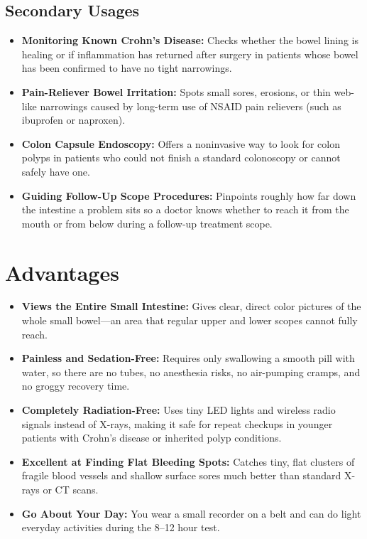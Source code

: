 \subsection{Secondary Usages}
\begin{itemize}
    \item \textbf{Monitoring Known Crohn's Disease:} Checks whether the bowel lining is healing or if inflammation has returned after surgery in patients whose bowel has been confirmed to have no tight narrowings.
    \item \textbf{Pain-Reliever Bowel Irritation:} Spots small sores, erosions, or thin web-like narrowings caused by long-term use of NSAID pain relievers (such as ibuprofen or naproxen).
    \item \textbf{Colon Capsule Endoscopy:} Offers a noninvasive way to look for colon polyps in patients who could not finish a standard colonoscopy or cannot safely have one.
    \item \textbf{Guiding Follow-Up Scope Procedures:} Pinpoints roughly how far down the intestine a problem sits so a doctor knows whether to reach it from the mouth or from below during a follow-up treatment scope.
\end{itemize}

\section{Advantages}
\begin{itemize}
    \item \textbf{Views the Entire Small Intestine:} Gives clear, direct color pictures of the whole small bowel---an area that regular upper and lower scopes cannot fully reach.
    \item \textbf{Painless and Sedation-Free:} Requires only swallowing a smooth pill with water, so there are no tubes, no anesthesia risks, no air-pumping cramps, and no groggy recovery time.
    \item \textbf{Completely Radiation-Free:} Uses tiny LED lights and wireless radio signals instead of X-rays, making it safe for repeat checkups in younger patients with Crohn's disease or inherited polyp conditions.
    \item \textbf{Excellent at Finding Flat Bleeding Spots:} Catches tiny, flat clusters of fragile blood vessels and shallow surface sores much better than standard X-rays or CT scans.
    \item \textbf{Go About Your Day:} You wear a small recorder on a belt and can do light everyday activities during the 8--12 hour test.
\end{itemize}

